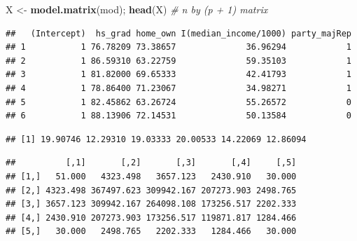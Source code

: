 \documentclass[]{article}
\newenvironment{Shaded}{\begin{snugshade}}{\end{snugshade}}
\newcommand{\CommentTok}[1]{\textcolor[rgb]{0.56,0.35,0.01}{\textit{#1}}}
\newcommand{\KeywordTok}[1]{\textcolor[rgb]{0.13,0.29,0.53}{\textbf{#1}}}
\newcommand{\NormalTok}[1]{#1}
\newcommand{\OperatorTok}[1]{\textcolor[rgb]{0.81,0.36,0.00}{\textbf{#1}}}
\newcommand{\OtherTok}[1]{\textcolor[rgb]{0.56,0.35,0.01}{#1}}
\newcommand{\StringTok}[1]{\textcolor[rgb]{0.31,0.60,0.02}{#1}}
\begin{document}
\begin{Shaded}
\begin{Highlighting}[]
\NormalTok{X <-}\StringTok{ }\KeywordTok{model.matrix}\NormalTok{(mod); }\KeywordTok{head}\NormalTok{(X)  }\CommentTok{# n by (p + 1) matrix}
\end{Highlighting}
\end{Shaded}

\begin{verbatim}
##   (Intercept)  hs_grad home_own I(median_income/1000) party_majRep
## 1           1 76.78209 73.38657              36.96294            1
## 2           1 86.59310 63.22759              59.35103            1
## 3           1 81.82000 69.65333              42.41793            1
## 4           1 78.86400 71.23067              34.98271            1
## 5           1 82.45862 63.26724              55.26572            0
## 6           1 88.13906 72.14531              50.13584            0
\end{verbatim}

\begin{Shaded}
\end{Shaded}

\begin{verbatim}
## [1] 19.90746 12.29310 19.03333 20.00533 14.22069 12.86094
\end{verbatim}

\begin{Shaded}
\end{Shaded}

\begin{verbatim}
##          [,1]       [,2]       [,3]       [,4]     [,5]
## [1,]   51.000   4323.498   3657.123   2430.910   30.000
## [2,] 4323.498 367497.623 309942.167 207273.903 2498.765
## [3,] 3657.123 309942.167 264098.108 173256.517 2202.333
## [4,] 2430.910 207273.903 173256.517 119871.817 1284.466
## [5,]   30.000   2498.765   2202.333   1284.466   30.000
\end{verbatim}
\end{document}
